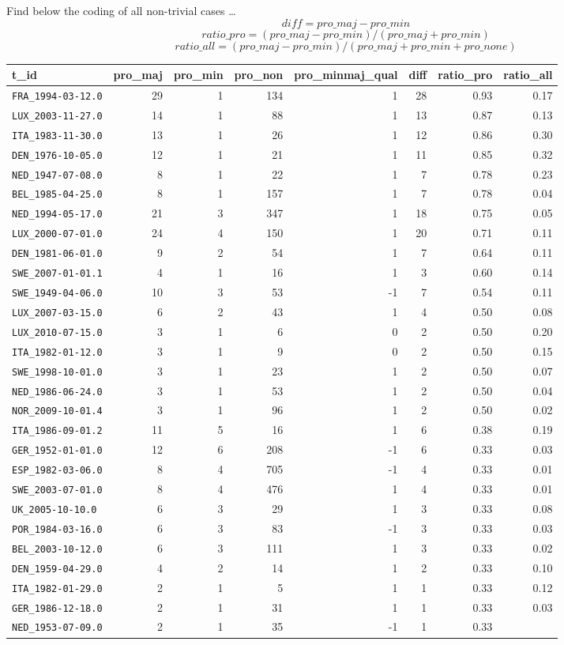 \documentclass[]{article}
\begin{document}
Find below the coding of all non-trivial cases \ldots{}
\[ diff = pro\_maj - pro\_min \]
\[ ratio\_pro = (pro\_maj - pro\_min) / (pro\_maj + pro\_min) \]
\[ ratio\_all = (pro\_maj - pro\_min) / (pro\_maj + pro\_min + pro\_none) \]

\begin{longtable}[c]{@{}lrrrrrrr@{}}
\toprule
t\_id & pro\_maj & pro\_min & pro\_non & pro\_minmaj\_qual & diff &
ratio\_pro & ratio\_all\tabularnewline
\midrule
\endhead
\texttt{FRA\_1994-03-12.0} & 29 & 1 & 134 & 1 & 28 & 0.93 &
0.17\tabularnewline
\texttt{LUX\_2003-11-27.0} & 14 & 1 & 88 & 1 & 13 & 0.87 &
0.13\tabularnewline
\texttt{ITA\_1983-11-30.0} & 13 & 1 & 26 & 1 & 12 & 0.86 &
0.30\tabularnewline
\texttt{DEN\_1976-10-05.0} & 12 & 1 & 21 & 1 & 11 & 0.85 &
0.32\tabularnewline
\texttt{NED\_1947-07-08.0} & 8 & 1 & 22 & 1 & 7 & 0.78 &
0.23\tabularnewline
\texttt{BEL\_1985-04-25.0} & 8 & 1 & 157 & 1 & 7 & 0.78 &
0.04\tabularnewline
\texttt{NED\_1994-05-17.0} & 21 & 3 & 347 & 1 & 18 & 0.75 &
0.05\tabularnewline
\texttt{LUX\_2000-07-01.0} & 24 & 4 & 150 & 1 & 20 & 0.71 &
0.11\tabularnewline
\texttt{DEN\_1981-06-01.0} & 9 & 2 & 54 & 1 & 7 & 0.64 &
0.11\tabularnewline
\texttt{SWE\_2007-01-01.1} & 4 & 1 & 16 & 1 & 3 & 0.60 &
0.14\tabularnewline
\texttt{SWE\_1949-04-06.0} & 10 & 3 & 53 & -1 & 7 & 0.54 &
0.11\tabularnewline
\texttt{LUX\_2007-03-15.0} & 6 & 2 & 43 & 1 & 4 & 0.50 &
0.08\tabularnewline
\texttt{LUX\_2010-07-15.0} & 3 & 1 & 6 & 0 & 2 & 0.50 &
0.20\tabularnewline
\texttt{ITA\_1982-01-12.0} & 3 & 1 & 9 & 0 & 2 & 0.50 &
0.15\tabularnewline
\texttt{SWE\_1998-10-01.0} & 3 & 1 & 23 & 1 & 2 & 0.50 &
0.07\tabularnewline
\texttt{NED\_1986-06-24.0} & 3 & 1 & 53 & 1 & 2 & 0.50 &
0.04\tabularnewline
\texttt{NOR\_2009-10-01.4} & 3 & 1 & 96 & 1 & 2 & 0.50 &
0.02\tabularnewline
\texttt{ITA\_1986-09-01.2} & 11 & 5 & 16 & 1 & 6 & 0.38 &
0.19\tabularnewline
\texttt{GER\_1952-01-01.0} & 12 & 6 & 208 & -1 & 6 & 0.33 &
0.03\tabularnewline
\texttt{ESP\_1982-03-06.0} & 8 & 4 & 705 & -1 & 4 & 0.33 &
0.01\tabularnewline
\texttt{SWE\_2003-07-01.0} & 8 & 4 & 476 & 1 & 4 & 0.33 &
0.01\tabularnewline
\texttt{UK\_2005-10-10.0} & 6 & 3 & 29 & 1 & 3 & 0.33 &
0.08\tabularnewline
\texttt{POR\_1984-03-16.0} & 6 & 3 & 83 & -1 & 3 & 0.33 &
0.03\tabularnewline
\texttt{BEL\_2003-10-12.0} & 6 & 3 & 111 & 1 & 3 & 0.33 &
0.02\tabularnewline
\texttt{DEN\_1959-04-29.0} & 4 & 2 & 14 & 1 & 2 & 0.33 &
0.10\tabularnewline
\texttt{ITA\_1982-01-29.0} & 2 & 1 & 5 & 1 & 1 & 0.33 &
0.12\tabularnewline
\texttt{GER\_1986-12-18.0} & 2 & 1 & 31 & 1 & 1 & 0.33 &
0.03\tabularnewline
\texttt{NED\_1953-07-09.0} & 2 & 1 & 35 & -1 & 1 & 0.33 &

\end{longtable}
\end{document}
